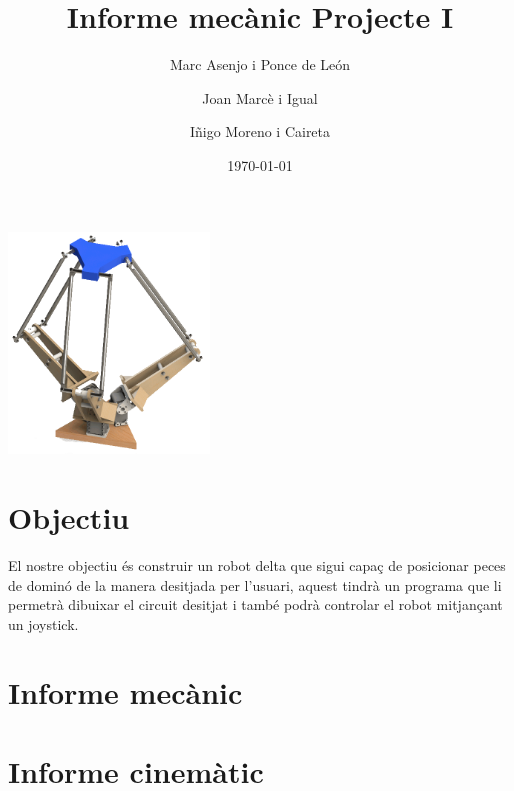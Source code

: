 \documentclass[a4paper, 12pt]{article}
\begin{document}
\title{Informe mecànic Projecte I}
\author{Marc Asenjo i Ponce de León \and
		Joan Marcè i Igual \and
		Iñigo Moreno i Caireta}
\date{\today}
\maketitle
\begin{center}
\includegraphics[width=0.4\textwidth]{./imgComp/logo}
\end{center}

\newpage
\tableofcontents{}

\newpage
\section{Objectiu}
El nostre objectiu és construir un robot delta que sigui capaç de posicionar peces de dominó de la manera desitjada per l'usuari, aquest tindrà un programa que li permetrà dibuixar el circuit desitjat i també podrà controlar el robot mitjançant un joystick.

\newpage
\section{Informe mecànic}


\newpage
\section{Informe cinemàtic}

\end{document}
